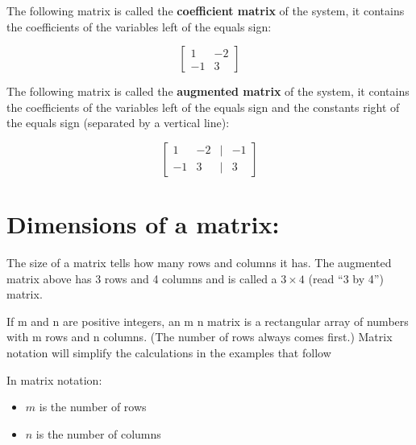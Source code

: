 \documentclass[
  letterpaper,
  DIV=11,
  numbers=noendperiod]{scrreprt}
\providecommand{\tightlist}{%
  \setlength{\itemsep}{0pt}\setlength{\parskip}{0pt}}\usepackage{longtable,booktabs,array}
\begin{document}
The following matrix is called the \textbf{coefficient matrix} of the
system, it contains the coefficients of the variables left of the equals
sign:

\[
\begin{bmatrix}
1 & -2\\
-1 & 3
\end{bmatrix}
\]

The following matrix is called the \textbf{augmented matrix} of the
system, it contains the coefficients of the variables left of the equals
sign and the constants right of the equals sign (separated by a vertical
line):

\[
\begin{bmatrix}
1 & -2 &|& -1\\
-1 & 3 &|& 3
\end{bmatrix}
\]

\hypertarget{dimensions-of-a-matrix}{%
\section*{Dimensions of a matrix:}\label{dimensions-of-a-matrix}}


The size of a matrix tells how many rows and columns it has. The
augmented matrix above has 3 rows and 4 columns and is called a
\(3 \times 4\) (read ``3 by 4'') matrix.

If m and n are positive integers, an m n matrix is a rectangular array
of numbers with m rows and n columns. (The number of rows always comes
first.) Matrix notation will simplify the calculations in the examples
that follow

\begin{tcolorbox}[enhanced jigsaw, colbacktitle=quarto-callout-tip-color!10!white, toprule=.15mm, colback=white, breakable, titlerule=0mm, leftrule=.75mm, bottomtitle=1mm, opacitybacktitle=0.6, bottomrule=.15mm, title=\textcolor{quarto-callout-tip-color}{\faLightbulb}\hspace{0.5em}{Tip}, left=2mm, colframe=quarto-callout-tip-color-frame, rightrule=.15mm, toptitle=1mm, opacityback=0, arc=.35mm, coltitle=black]

In matrix notation:

\begin{itemize}
\tightlist
\item
  \(m\) is the number of rows
\item
  \(n\) is the number of columns
\end{itemize}

\end{tcolorbox}
\end{document}
